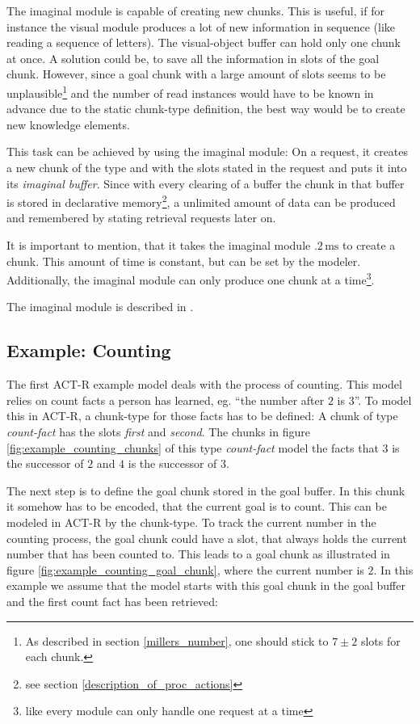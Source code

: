 The imaginal module is capable of creating new chunks. This is useful, if for instance the visual module produces a lot of new information in sequence (like reading a sequence of letters). The visual-object buffer can hold only one chunk at once. A solution could be, to save all the information in slots of the goal chunk. However, since a goal chunk with a large amount of slots seems to be unplausible\footnote{As described in section \ref{millers_number}, one should stick to $7 \pm 2$ slots for each chunk.} and the number of read instances would have to be known in advance due to the static chunk-type definition, the best way would be to create new knowledge elements.

This task can be achieved by using the imaginal module: On a request, it creates a new chunk of the type and with the slots stated in the request and puts it into its \emph{imaginal buffer}. Since with every clearing of a buffer the chunk in that buffer is stored in declarative memory\footnote{see section \ref{description_of_proc_actions}}, a unlimited amount of data can be produced and remembered by stating retrieval requests later on.

It is important to mention, that it takes the imaginal module $.2\,\mathrm{ms}$ to create a chunk. This amount of time is constant, but can be set by the modeler. Additionally, the imaginal module can only produce one chunk at a time\footnote{like every module can only handle one request at a time}.

The imaginal module is described in \cite[unit 2]{actr_tutorial}.

\subsection{Example: Counting}
\label{example_counting}

The first ACT-R example model deals with the process of counting. This model relies on count facts a person has learned, eg. "`the number after $2$ is $3$"'. To model this in ACT-R, a chunk-type for those facts has to be defined: A chunk of type \emph{count-fact} has the slots \emph{first} and \emph{second}. The chunks in figure \ref{fig:example_counting_chunks} of this type \emph{count-fact} model the facts that $3$ is the successor of $2$ and $4$ is the successor of $3$.

The next step is to define the goal chunk stored in the goal buffer. In this chunk it somehow has to be encoded, that the current goal is to count. This can be modeled in ACT-R by the chunk-type. To track the current number in the counting process, the goal chunk could have a slot, that always holds the current number that has been counted to. This leads to a goal chunk as illustrated in figure \ref{fig:example_counting_goal_chunk}, where the current number is $2$. In this example we assume that the model starts with this goal chunk in the goal buffer and the first count fact has been retrieved:

